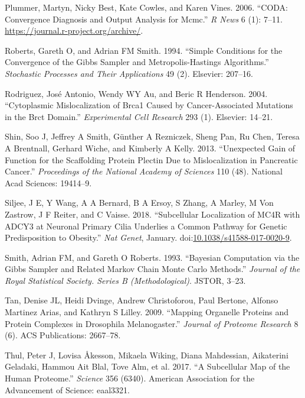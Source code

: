 \documentclass[]{article}
\begin{document}
\hypertarget{ref-coda}{}
Plummer, Martyn, Nicky Best, Kate Cowles, and Karen Vines. 2006. ``CODA:
Convergence Diagnosis and Output Analysis for Mcmc.'' \emph{R News} 6
(1): 7--11. \url{https://journal.r-project.org/archive/}.

\hypertarget{ref-Roberts:1994}{}
Roberts, Gareth O, and Adrian FM Smith. 1994. ``Simple Conditions for
the Convergence of the Gibbs Sampler and Metropolis-Hastings
Algorithms.'' \emph{Stochastic Processes and Their Applications} 49 (2).
Elsevier: 207--16.

\hypertarget{ref-Rodriguez:2004}{}
Rodriguez, José Antonio, Wendy WY Au, and Beric R Henderson. 2004.
``Cytoplasmic Mislocalization of Brca1 Caused by Cancer-Associated
Mutations in the Brct Domain.'' \emph{Experimental Cell Research} 293
(1). Elsevier: 14--21.

\hypertarget{ref-Shin:2013}{}
Shin, Soo J, Jeffrey A Smith, Günther A Rezniczek, Sheng Pan, Ru Chen,
Teresa A Brentnall, Gerhard Wiche, and Kimberly A Kelly. 2013.
``Unexpected Gain of Function for the Scaffolding Protein Plectin Due to
Mislocalization in Pancreatic Cancer.'' \emph{Proceedings of the
National Academy of Sciences} 110 (48). National Acad Sciences:
19414--9.

\hypertarget{ref-Siljee:2018}{}
Siljee, J E, Y Wang, A A Bernard, B A Ersoy, S Zhang, A Marley, M Von
Zastrow, J F Reiter, and C Vaisse. 2018. ``Subcellular Localization of
MC4R with ADCY3 at Neuronal Primary Cilia Underlies a Common Pathway for
Genetic Predisposition to Obesity.'' \emph{Nat Genet}, January.
doi:\href{https://doi.org/10.1038/s41588-017-0020-9}{10.1038/s41588-017-0020-9}.

\hypertarget{ref-Smith:1993}{}
Smith, Adrian FM, and Gareth O Roberts. 1993. ``Bayesian Computation via
the Gibbs Sampler and Related Markov Chain Monte Carlo Methods.''
\emph{Journal of the Royal Statistical Society. Series B
(Methodological)}. JSTOR, 3--23.

\hypertarget{ref-Tan:2009}{}
Tan, Denise JL, Heidi Dvinge, Andrew Christoforou, Paul Bertone, Alfonso
Martinez Arias, and Kathryn S Lilley. 2009. ``Mapping Organelle Proteins
and Protein Complexes in Drosophila Melanogaster.'' \emph{Journal of
Proteome Research} 8 (6). ACS Publications: 2667--78.

\hypertarget{ref-Thul:2017}{}
Thul, Peter J, Lovisa Åkesson, Mikaela Wiking, Diana Mahdessian,
Aikaterini Geladaki, Hammou Ait Blal, Tove Alm, et al. 2017. ``A
Subcellular Map of the Human Proteome.'' \emph{Science} 356 (6340).
American Association for the Advancement of Science: eaal3321.
\end{document}
